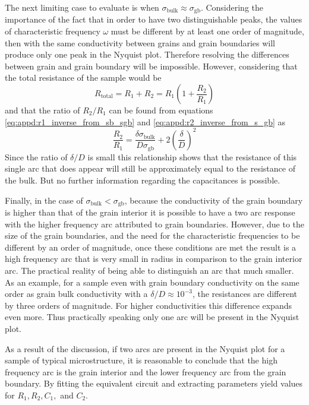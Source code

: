 The next limiting case to evaluate is when $\sigma_{\mathrm{bulk}}\approx \sigma_{\mathrm{gb}}$. Considering the importance of the fact that in order to have two distinguishable peaks, the values of characteristic frequency $\omega$ must be different by at least one order of magnitude, then with the same conductivity between grains and grain boundaries will produce only one peak in the Nyquist plot. Therefore resolving the differences between grain and grain boundary will be impossible. However, considering that the total resistance of the sample would be
\begin{equation}
    R_{\mathrm{total}} = R_1 + R_2 = R_1\left(1 + \frac{R_2}{R_1}\right)
    \label{eq:appd:totalResistance}
\end{equation}
and that the ratio of $R_2/R_1$ can be found from equations \ref{eq:appd:r1_inverse_from_sb_sgb} and \ref{eq:appd:r2_inverse_from_s_gb} as 
\begin{equation}
    \frac{R_2}{R_1} = \frac{\delta \sigma_{\mathrm{bulk}}}{D \sigma_{\mathrm{gb}}}+2\left(\frac{\delta}{D}\right)^2
\end{equation}
Since the ratio of $\delta/D$ is small this relationship shows that the resistance of this single arc that does appear will still be approximately equal to the resistance of the bulk. But no further information regarding the capacitances is possible. 



Finally, in the case of $\sigma_{\mathrm{bulk}}<\sigma_{\mathrm{gb}}$, because the conductivity of the grain boundary is higher than that of the grain interior it is possible to have a two arc response with the higher frequency arc attributed to grain boundaries. However, due to the size of the grain boundaries, and the need for the characteristic frequencies to be different by an order of magnitude, once these conditions are met the result is a high frequency arc that is very small in radius in comparison to the grain interior arc. The practical reality of being able to distinguish an arc that much smaller. As an example, for a sample even with grain boundary conductivity on the same order as grain bulk conductivity with a $\delta/D \approx 10^{-3}$, the resistances are different by three orders of magnitude. For higher conductivities this difference expands even more. Thus practically speaking only one arc will be present in the Nyquist plot.


As a result of the discussion, if two arcs are present in the Nyquist plot for a sample of typical microstructure, it is reasonable to conclude that the high frequency arc is the grain interior and the lower frequency arc from the grain boundary. By fitting the equivalent circuit and extracting parameters yield values for $R_1, R_2, C_1,$ and $C_2$.

